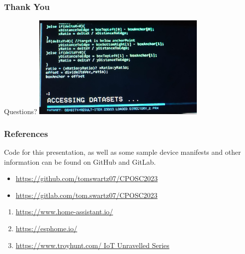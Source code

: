 \documentclass[aspectratio=169]{beamer}
\begin{document}
\begin{frame}
  \frametitle{Thank You}
  \begin{center}
    \LARGE{Questions?}
    \vfill
    \includegraphics[height=5cm]{images/lol-code.jpg}
  \end{center}
\end{frame}
\begin{frame}
  \frametitle{References}
  Code for this presentation, as well as some sample device manifests and other
  information can be found on GitHub and GitLab.
  \begin{itemize}
    \item{\href{https://github.com/tomswartz07/CPOSC2023}{https://github.com/tomswartz07/CPOSC2023}}
    \item{\href{https://gitlab.com/tom.swartz07/CPOSC2023}{https://gitlab.com/tom.swartz07/CPOSC2023}}
  \end{itemize}
  \vfill
  \begin{enumerate}
    \item{\href{https://www.home-assistant.io/}{https://www.home-assistant.io/}}
    \item{\href{https://esphome.io/}{https://esphome.io/}}
    \item{\href{https://www.troyhunt.com/iot-unravelled-part-1-its-a-mess-but-then-theres-home-assistant/}{https://www.troyhunt.com/ IoT Unravelled Series}}
  \end{enumerate}
\end{frame}
\end{document}
